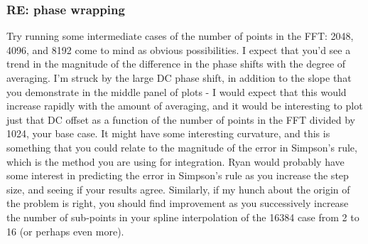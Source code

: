 \documentclass[crop=false,class=book]{standalone}
\begin{document}
        \subsubsection{\footnotesize RE: phase wrapping}
        Try running some intermediate cases of the number of points in the FFT: 2048, 4096, and 8192 come to mind as obvious possibilities. I expect that you'd see a trend in the magnitude of the difference in the phase shifts with the degree of averaging. I'm struck by the large DC phase shift, in addition to the slope that you demonstrate in the middle panel of plots - I would expect that this would increase rapidly with the amount of averaging, and it would be interesting to plot just that DC offset as a function of the number of points in the FFT divided by 1024, your base case. It might have some interesting curvature, and this is something that you could relate to the magnitude of the error in Simpson's rule, which is the method you are using for integration. Ryan would probably have some interest in predicting the error in Simpson's rule as you increase the step size, and seeing if your results agree. Similarly, if my hunch about the origin of the problem is right, you should find improvement as you successively increase the number of sub-points in your spline interpolation of the 16384 case from 2 to 16 (or perhaps even more).
\end{document}

